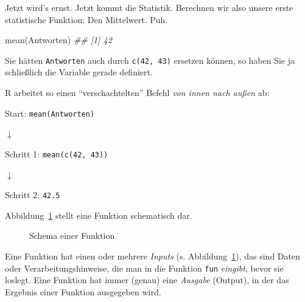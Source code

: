 \documentclass[
  letterpaper,
  twoside,
  open=any]{scrbook}
\newenvironment{Shaded}{\begin{snugshade}}{\end{snugshade}}
\newcommand{\DocumentationTok}[1]{\textcolor[rgb]{0.37,0.37,0.37}{\textit{#1}}}
\newcommand{\FunctionTok}[1]{\textcolor[rgb]{0.28,0.35,0.67}{#1}}
\newcommand{\NormalTok}[1]{\textcolor[rgb]{0.00,0.23,0.31}{#1}}
\theoremstyle{definition}
\theoremstyle{definition}
\theoremstyle{definition}
\theoremstyle{remark}
\begin{document}
Jetzt wird's ernst. Jetzt kommt die Statistik. Berechnen wir also unsere
erste statistische Funktion: Den Mittelwert. Puh.

\begin{Shaded}
\begin{Highlighting}[]
\FunctionTok{mean}\NormalTok{(Antworten)}
\DocumentationTok{\#\# [1] 42}
\end{Highlighting}
\end{Shaded}

Sie hätten \texttt{Antworten} auch durch \texttt{c(42,\ 43)} ersetzen
können, so haben Sie ja schließlich die Variable gerade definiert.

R arbeitet so einen \enquote{verschachtelten} Befehl \emph{von innen
nach außen} ab:

Start: \texttt{mean(Antworten)}

{\(\downarrow\)}

Schritt 1: \texttt{mean(c(42,\ 43))}

{\(\downarrow\)}

Schritt 2: \texttt{42.5}

Abbildung~\ref{fig-function-schema} stellt eine Funktion schematisch
dar.

\begin{figure}


\caption{\label{fig-function-schema}Schema einer Funktion}

\end{figure}%

Eine Funktion hat einen oder mehrere \emph{Inputs} (s.
Abbildung~\ref{fig-function-schema}), das sind Daten oder
Verarbeitungshinweise, die man in die Funktion \texttt{fun}
\emph{eingibt}, bevor sie loslegt. Eine Funktion hat immer (genau) eine
\emph{Ausgabe} (Output), in der das Ergebnis einer Funktion ausgegeben
wird.
\end{document}
